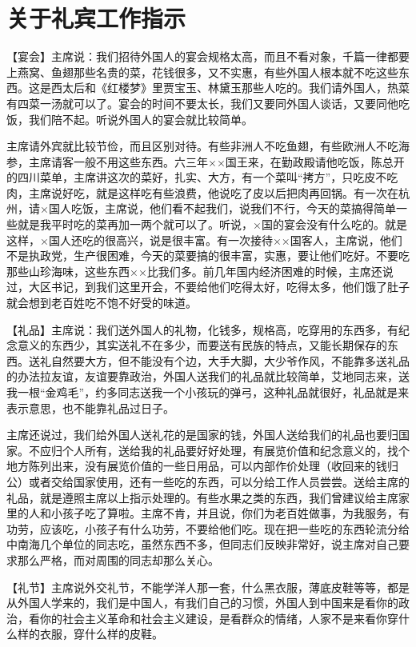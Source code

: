 \section[关于礼宾工作指示（一九六五年）]{关于礼宾工作指示}


【宴会】主席说：我们招待外国人的宴会规格太高，而且不看对象，千篇一律都要上燕窝、鱼翅那些名贵的菜，花钱很多，又不实惠，有些外国人根本就不吃这些东西。这是西太后和《红楼梦》里贾宝玉、林黛玉那些人吃的。我们请外国人，热菜有四菜一汤就可以了。宴会的时间不要太长，我们又要同外国人谈话，又要同他吃饭，我们陪不起。听说外国人的宴会就比较简单。

主席请外宾就比较节俭，而且区别对待。有些非洲人不吃鱼翅，有些欧洲人不吃海参，主席请客一般不用这些东西。六三年××国王来，在勤政殿请他吃饭，陈总开的四川菜单，主席讲这次的菜好，扎实、大方，有一个菜叫“拷方”，只吃皮不吃肉，主席说好吃，就是这样吃有些浪费，他说吃了皮以后把肉再回锅。有一次在杭州，请×国人吃饭，主席说，他们看不起我们，说我们不行，今天的菜搞得简单一些就是我平时吃的菜再加一两个就可以了。听说，×国的宴会没有什么吃的。就是这样，×国人还吃的很高兴，说是很丰富。有一次接待××国客人，主席说，他们不是执政党，生产很困难，今天的菜要搞的很丰富，实惠，要让他们吃好。不要吃那些山珍海味，这些东西××比我们多。前几年国内经济困难的时候，主席还说过，大区书记，到我们这里开会，不要给他们吃得太好，吃得太多，他们饿了肚子就会想到老百姓吃不饱不好受的味道。

【礼品】主席说：我们送外国人的礼物，化钱多，规格高，吃穿用的东西多，有纪念意义的东西少，其实送礼不在多少，而要送有民族的特点，又能长期保存的东西。送礼自然要大方，但不能没有个边，大手大脚，大少爷作风，不能靠多送礼品的办法拉友谊，友谊要靠政治，外国人送我们的礼品就比较简单，艾地同志来，送我一根“金鸡毛”，约多同志送我一个小孩玩的弹弓，这种礼品就很好，礼品就是来表示意思，也不能靠礼品过日子。

主席还说过，我们给外国人送礼花的是国家的钱，外国人送给我们的礼品也要归国家。不应归个人所有，送给我的礼品要好好处理，有展览价值和纪念意义的，找个地方陈列出来，没有展览价值的一些日用品，可以内部作价处理（收回来的钱归公）或者交给国家使用，还有一些吃的东西，可以分给工作人员尝尝。送给主席的礼品，就是遵照主席以上指示处理的。有些水果之类的东西，我们曾建议给主席家里的人和小孩子吃了算啦。主席不肯，并且说，你们为老百姓做事，为我服务，有功劳，应该吃，小孩子有什么功劳，不要给他们吃。现在把一些吃的东西轮流分给中南海几个单位的同志吃，虽然东西不多，但同志们反映非常好，说主席对自己要求那么严格，而对周围的同志却那么关心。

【礼节】主席说外交礼节，不能学洋人那一套，什么黑衣服，薄底皮鞋等等，都是从外国人学来的，我们是中国人，有我们自己的习惯，外国人到中国来是看你的政治，看你的社会主义革命和社会主义建设，是看群众的情绪，人家不是来看你穿什么样的衣服，穿什么样的皮鞋。

